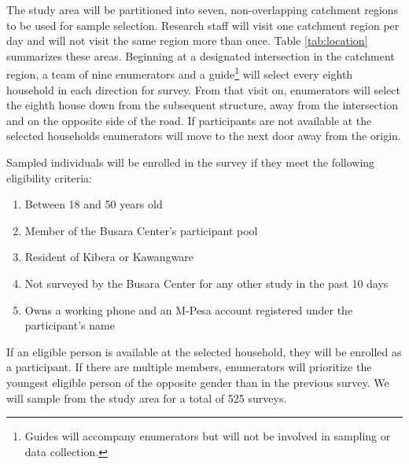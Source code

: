 \documentclass[11pt, a4paper]{article}\usepackage[]{graphicx}\usepackage[]{color}
\begin{document}
        The study area will be partitioned into seven, non-overlapping catchment regions to be used for sample selection. Research staff will visit one catchment region per day and will not visit the same region more than once. Table \ref{tab:location} summarizes these areas. Beginning at a designated intersection in the catchment region, a team of nine enumerators and a guide\footnote{Guides will accompany enumerators but will not be involved in sampling or data collection.} will select every eighth household in each direction for survey. From that visit on, enumerators will select the eighth house down from the subsequent structure, away from the intersection and on the opposite side of the road. If participants are not available at the selected households enumerators will move to the next door away from the origin.

        Sampled individuals will be enrolled in the survey if they meet the following eligibility criteria:

        \begin{enumerate}
            \item Between 18 and 50 years old
            \item Member of the Busara Center's participant pool
            \item Resident of Kibera or Kawangware
            \item Not surveyed by the Busara Center for any other study in the past 10 days
            \item Owns a working phone and an M-Pesa account registered under the participant's name
        \end{enumerate}

        If an eligible person is available at the selected household, they will be enrolled as a participant. If there are multiple members, enumerators will prioritize the youngest eligible person of the opposite gender than in the previous survey. We will sample from the study area for a total of 525 surveys.

        \begin{table}[t]
        \centering
        \caption{Survey location}
        \label{tab:location}
        \end{table}
\end{document}
